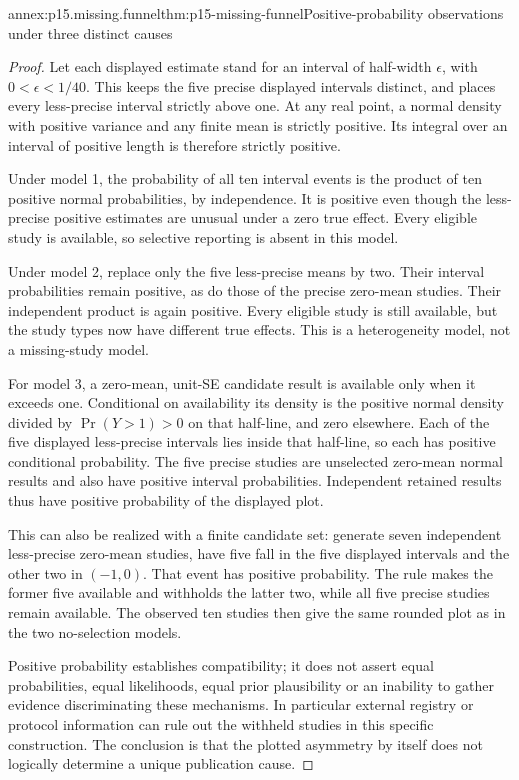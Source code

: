 \begin{annexitem}{annex:p15.missing.funnel}{thm:p15-missing-funnel}{Positive-probability observations under three distinct causes}
\begin{proof}
Let each displayed estimate stand for an interval of half-width
\(\epsilon\), with \(0<\epsilon<1/40\). This keeps the
five precise displayed intervals distinct, and places every
less-precise interval strictly above one. At any real point, a
normal density with positive variance and any finite mean is
strictly positive. Its integral over an interval of positive
length is therefore strictly positive.

Under model 1, the probability of all ten interval events is the
product of ten positive normal probabilities, by independence.
It is positive even though the less-precise positive estimates
are unusual under a zero true effect. Every eligible study is
available, so selective reporting is absent in this model.

Under model 2, replace only the five less-precise means by two.
Their interval probabilities remain positive, as do those of
the precise zero-mean studies. Their independent product is
again positive. Every eligible study is still available, but
the study types now have different true effects. This is a
heterogeneity model, not a missing-study model.

For model 3, a zero-mean, unit-SE candidate result is available
only when it exceeds one. Conditional on availability its density
is the positive normal density divided by \(\Pr(Y>1)>0\)
on that half-line, and zero elsewhere. Each of the five displayed
less-precise intervals lies inside that half-line, so each has
positive conditional probability. The five precise studies are
unselected zero-mean normal results and also have positive interval
probabilities. Independent retained results thus have positive
probability of the displayed plot.

This can also be realized with a finite candidate set: generate
seven independent less-precise zero-mean studies, have five fall
in the five displayed intervals and the other two in \((-1,0)\).
That event has positive probability. The rule makes the former
five available and withholds the latter two, while all five
precise studies remain available. The observed ten studies then
give the same rounded plot as in the two no-selection models.

Positive probability establishes compatibility; it does not
assert equal probabilities, equal likelihoods, equal prior
plausibility or an inability to gather evidence discriminating
these mechanisms. In particular external registry or protocol
information can rule out the withheld studies in this specific
construction. The conclusion is that the plotted asymmetry by
itself does not logically determine a unique publication cause.
\end{proof}
\end{annexitem}
